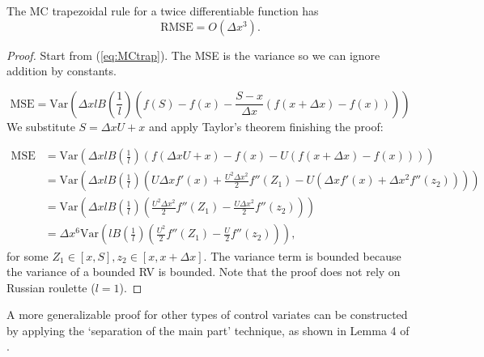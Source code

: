 \documentclass[a4paper,12pt]{article}
\begin{document}
\begin{lemma} \label{lem:rmse mctrap}
  The MC trapezoidal rule
  for a twice differentiable function has
  \begin{equation}
    \text{RMSE} =O\left( \Delta x^{3} \right) .
  \end{equation}
\end{lemma}

\begin{proof}
  Start from (\ref{eq:MCtrap}). The MSE is the variance
  so we can ignore addition by constants.

  \begin{equation}
    \text{MSE} = \text{Var}\left( \Delta x l B\left( \frac{1}{l}\right)
    \left(f(S) - f(x) - \frac{S - x}{\Delta x}
    \left(f(x+\Delta x) - f(x)\right) \right)\right)
  \end{equation}
  We substitute $S = \Delta x U + x$ and apply Taylor's theorem
  finishing the proof:

  \begin{align}
    \text{MSE} & = \text{Var}\left( \Delta x l B\left( \frac{1}{l}\right)
    \left(f(\Delta x U+x) - f(x) - U
    \left(f(x+\Delta x) - f(x)\right) \right)\right)                           \\
               & = \text{Var}\left( \Delta x l B\left( \frac{1}{l}\right)
    \left( U \Delta x f'(x)+ \frac{U^{2} \Delta x ^{2}}{2} f''(Z_{1})
    - U \left( \Delta x f'(x) +
    \Delta x ^{2} f''(z_{2})\right) \right)\right)                             \\
               & = \text{Var}\left( \Delta x l B\left( \frac{1}{l}\right)
    \left( \frac{U^{2} \Delta x ^{2}}{2} f''(Z_{1})
    -  \frac{U\Delta x ^{2}}{2} f''(z_{2}) \right)\right)                      \\
               & =\Delta x ^{6} \text{Var}\left(  l B\left( \frac{1}{l}\right)
    \left( \frac{U^{2} }{2} f''(Z_{1})
    -  \frac{U}{2} f''(z_{2}) \right)\right),
  \end{align}
  for some $Z_{1} \in [x,S], z_{2} \in [x,x+\Delta x]$. The variance term is bounded
  because the variance of a bounded RV is bounded.
  Note that the proof does not rely on Russian roulette ($l=1$).
\end{proof}

\begin{related}
  A more generalizable proof for other types of control variates can
  be constructed by applying the \enquote*{separation of the main part} technique,
  as shown in Lemma 4 of \cite{heinrich_monte_1993}.
\end{related}
\end{document}
